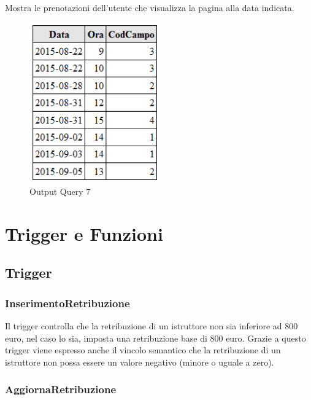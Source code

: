 Mostra le prenotazioni dell'utente che visualizza la pagina alla data indicata.\\



\begin{figure}[H]
 \centering
  \includegraphics[width=0.5\textwidth]{images/Query7.PNG}
\caption{Output Query 7}
\end{figure}

\chapter{Trigger e Funzioni} 

\section{Trigger}

\subsection{InserimentoRetribuzione}


Il trigger controlla che la retribuzione di un istruttore non sia inferiore ad 800 euro, nel caso lo sia, imposta una retribuzione base di 800 euro.
Grazie a questo trigger viene espresso anche il vincolo semantico che la retribuzione di un istruttore non possa essere un valore negativo (minore o uguale a zero).

\subsection{AggiornaRetribuzione}


